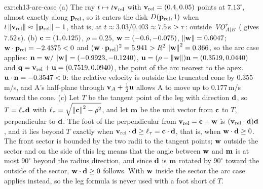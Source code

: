 \begin{solution}{exr:ch13-arc-case}
(a) The ray $t \mapsto t\mathbf{v}_{\mathrm{rel}}$ with $\mathbf{v}_{\mathrm{rel}} = (0.4, 0.05)$ points at $7.13^\circ$, almost exactly along $\mathbf{p}_{\mathrm{rel}}$, so it enters the disk $D(\mathbf{p}_{\mathrm{rel}},1)$ when $t\left\lVert \mathbf{v}_{\mathrm{rel}} \right\rVert \approx \left\lVert \mathbf{p}_{\mathrm{rel}} \right\rVert - 1$, that is, at $t \approx 3.03/0.403 \approx 7.5$\,s $> \tau$: outside $\mathit{VO}^{\tau}_{A|B}$ ( gives $7.52$\,s). (b) $\mathbf{c} = (1, 0.125)$, $\rho = 0.25$, $\mathbf{w} = (-0.6, -0.075)$, $\left\lVert \mathbf{w} \right\rVert = 0.6047$; $\mathbf{w}\cdot\mathbf{p}_{\mathrm{rel}} = -2.4375 < 0$ and $(\mathbf{w}\cdot\mathbf{p}_{\mathrm{rel}})^2 = 5.941 > R^2\left\lVert \mathbf{w} \right\rVert^2 = 0.366$, so the arc case applies: $\mathbf{n} = \mathbf{w}/\left\lVert \mathbf{w} \right\rVert = (-0.9923, -0.1240)$, $\mathbf{u} = (\rho - \left\lVert \mathbf{w} \right\rVert)\mathbf{n} = (0.3519, 0.0440)$ and $\mathbf{q} = \mathbf{v}_{\mathrm{rel}} + \mathbf{u} = (0.7519, 0.0940)$, the point of the arc nearest to the apex. $\mathbf{u}\cdot\mathbf{n} = -0.3547 < 0$: the relative velocity is outside the truncated cone by $0.355$\,m/s, and A's half-plane through $\mathbf{v}_A + \tfrac12\mathbf{u}$ allows A to move up to $0.177$\,m/s toward the cone. (c) Let $T$ be the tangent point of the leg with direction $\mathbf{d}$, so $T = \ell_\tau\mathbf{d}$ with $\ell_\tau = \sqrt{\left\lVert \mathbf{c} \right\rVert^2 - \rho^2}$, and let $\mathbf{m}$ be the unit vector from $\mathbf{c}$ to $T$, perpendicular to $\mathbf{d}$. The foot of the perpendicular from $\mathbf{v}_{\mathrm{rel}} = \mathbf{c} + \mathbf{w}$ is $(\mathbf{v}_{\mathrm{rel}}\cdot\mathbf{d})\mathbf{d}$, and it lies beyond $T$ exactly when $\mathbf{v}_{\mathrm{rel}}\cdot\mathbf{d} \ge \ell_\tau = \mathbf{c}\cdot\mathbf{d}$, that is, when $\mathbf{w}\cdot\mathbf{d} \ge 0$. The front sector is bounded by the two radii to the tangent points; $\mathbf{w}$ outside the sector and on the side of this leg means that the angle between $\mathbf{w}$ and $\mathbf{m}$ is at most $90^\circ$ beyond the radius direction, and since $\mathbf{d}$ is $\mathbf{m}$ rotated by $90^\circ$ toward the outside of the sector, $\mathbf{w}\cdot\mathbf{d} \ge 0$ follows. With $\mathbf{w}$ inside the sector the arc case applies instead, so the leg formula is never used with a foot short of $T$.
\end{solution}

